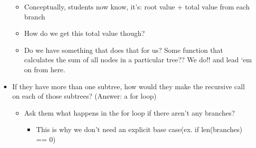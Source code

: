 \begin{blocksection}
\begin{guide}
\begin{itemize}
\begin{itemize}
                \item Conceptually, students now know, it’s: root value + total value from each branch
                \item How do we get this total value though?
                \item Do we have something that does that for us? Some function that calculates the sum of all nodes in a particular tree?? We do!! and lead ‘em on from here.
            \end{itemize}
            \item If they have more than one subtree, how would they make the recursive call on each of those subtrees? (Answer: a for loop)
            \begin{itemize}
                \item Ask them what happens in the for loop if there aren’t any branches?
                \begin{itemize}
                    \item This is why we don’t need an explicit base case(ex. if len(branches) == 0)
                \end{itemize}
            \end{itemize}
	\end{itemize}
	\end{guide}
\end{blocksection}